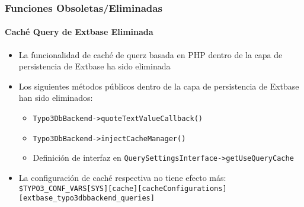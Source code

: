 \begin{frame}[fragile]
	\frametitle{Funciones Obsoletas/Eliminadas}
	\framesubtitle{Caché Query de Extbase Eliminada}

	\begin{itemize}

		\item La funcionalidad de caché de querz basada en PHP dentro de la capa de persistencia de Extbase ha sido eliminada

		\item Los siguientes métodos públicos dentro de la capa de persistencia de Extbase han sido eliminados:

			\begin{itemize}
				\item \small\texttt{Typo3DbBackend->quoteTextValueCallback()}\normalsize
				\item \small\texttt{Typo3DbBackend->injectCacheManager()}\normalsize
				\item Definición de interfaz en \small\texttt{QuerySettingsInterface->getUseQueryCache}\normalsize
			\end{itemize}

		\item La configuración de caché respectiva no tiene efecto más:\newline
			\smaller
				\texttt{\$TYPO3\_CONF\_VARS[SYS][cache][cacheConfigurations]}\newline
				\tabto{0.4cm}\texttt{[extbase\_typo3dbbackend\_queries]}
			\normalsize

	\end{itemize}

\end{frame}


